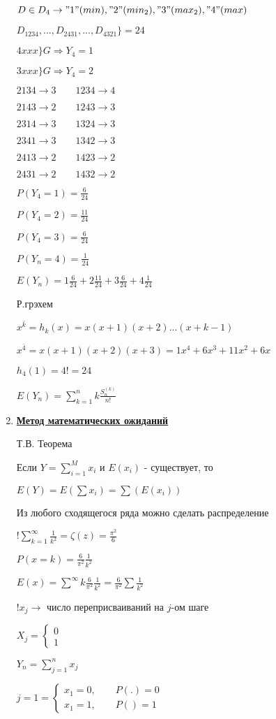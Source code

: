 \documentclass[12pt]{report}
\begin{document}
\begin{enumerate}
		$D \in D_4 \rightarrow "1"(min),"2"(min_2),"3"(max_2), "4"(max)$\par
		$D_1234,...,D_2431,...,D_4321 \}= 24$\par
		$4xxx \}G \Rightarrow Y_4=1$\par
		$3xxx \}G \Rightarrow Y_4=2$\par
		$2134 \rightarrow 3 \qquad 1234 \rightarrow 4$\par
		$2143 \rightarrow 2 \qquad 1243 \rightarrow 3$\par
		$2314 \rightarrow 3 \qquad 1324 \rightarrow 3$\par
		$2341 \rightarrow 3 \qquad 1342 \rightarrow 3$\par
		$2413 \rightarrow 2 \qquad 1423 \rightarrow 2$\par
		$2431 \rightarrow 2 \qquad 1432 \rightarrow 2$\par
		$P(Y_4=1) = \frac{6}{24}$\par
		$P(Y_4=2) = \frac{11}{24}$\par
		$P(Y_4=3) = \frac{6}{24}$\par
		$P(Y_n=4) = \frac{1}{24}$\par
		$E(Y_n)=1\frac{6}{24} + 2\frac{11}{24} + 3\frac{6}{24} + 4\frac{1}{24}$\par
		Р.грэхем\par
		$x^{\bar{k}} = h_k(x)=x(x+1)(x+2)...(x+k-1)$\par
		$x^{\bar{4}} = x(x+1)(x+2)(x+3) = 1x^4+6x^3+11x^2+6x$\par
		$h_4(1)=4!=24$\par
		$E(Y_n)=\sum_{k=1}^nk\frac{S_n^{(k)}}{n!}$\par

		\item \textbf{\underline{Метод математических ожиданий}}\par
		Т.В. Теорема\par
		Если $Y=\sum_{i=1}^Mx_i$ и $E(x_i)$ - существует, то\par
		$E(Y)=E(\sum x_i) = \sum (E(x_i))$\par
		Из любого сходящегося ряда можно сделать распределение\par
		$!\sum_{k=1}^\infty \frac{1}{k^2}=\zeta (z)=\frac{\pi^2}{6}$\par
		$P(x=k)=\frac{6}{\pi^2}\frac{1}{k^2}$\par
		$E(x)=\sum^{\infty}k\frac{6}{\pi^2}\frac{1}{k^2} = \frac{6}{\pi^2}\sum \frac{1}{k^2}$\par
		$!x_j\rightarrow$ число переприсваиваний на $j$-ом шаге\par
		$X_j=\left\{
			\begin{array}{c}
				0\\
				1
			\end{array}
		\right.$\par
		$Y_n=\sum_{j=1}^n x_j$\par
		$j=1 = \left\{
			\begin{array}{c}
				x_1=0,\qquad P(.)=0\\
				x_1=1,\qquad P()=1
			\end{array}
		\right.$\par


\end{enumerate}
\end{document}
